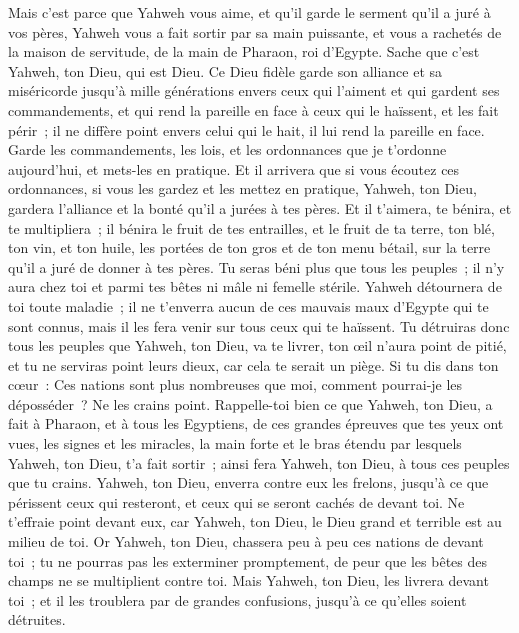 \begin{multicols}{2}
Mais c'est parce que Yahweh vous aime, et qu'il garde le serment qu'il a juré à vos pères, Yahweh vous a fait sortir par sa main puissante, et vous a rachetés de la maison de servitude, de la main de Pharaon, roi d'Egypte.
Sache que c'est Yahweh, ton Dieu, qui est Dieu. Ce Dieu fidèle garde son alliance et sa miséricorde jusqu'à mille générations envers ceux qui l'aiment et qui gardent ses commandements,
et qui rend la pareille en face à ceux qui le haïssent, et les fait périr~; il ne diffère point envers celui qui le hait, il lui rend la pareille en face.
Garde les commandements, les lois, et les ordonnances que je t'ordonne aujourd'hui, et mets-les en pratique.
Et il arrivera que si vous écoutez ces ordonnances, si vous les gardez et les mettez en pratique, Yahweh, ton Dieu, gardera l'alliance et la bonté qu'il a jurées à tes pères.
Et il t'aimera, te bénira, et te multipliera~; il bénira le fruit de tes entrailles, et le fruit de ta terre, ton blé, ton vin, et ton huile, les portées de ton gros et de ton menu bétail, sur la terre qu'il a juré de donner à tes pères.
Tu seras béni plus que tous les peuples~; il n'y aura chez toi et parmi tes bêtes ni mâle ni femelle stérile.
Yahweh détournera de toi toute maladie~; il ne t'enverra aucun de ces mauvais maux d'Egypte qui te sont connus, mais il les fera venir sur tous ceux qui te haïssent.
Tu détruiras donc tous les peuples que Yahweh, ton Dieu, va te livrer, ton œil n'aura point de pitié, et tu ne serviras point leurs dieux, car cela te serait un piège.
Si tu dis dans ton cœur~: Ces nations sont plus nombreuses que moi, comment pourrai-je les déposséder~?
Ne les crains point. Rappelle-toi bien ce que Yahweh, ton Dieu, a fait à Pharaon, et à tous les Egyptiens,
de ces grandes épreuves que tes yeux ont vues, les signes et les miracles, la main forte et le bras étendu par lesquels Yahweh, ton Dieu, t'a fait sortir~; ainsi fera Yahweh, ton Dieu, à tous ces peuples que tu crains.
Yahweh, ton Dieu, enverra contre eux les frelons, jusqu'à ce que périssent ceux qui resteront, et ceux qui se seront cachés de devant toi.
Ne t'effraie point devant eux, car Yahweh, ton Dieu, le Dieu grand et terrible est au milieu de toi.
Or Yahweh, ton Dieu, chassera peu à peu ces nations de devant toi~; tu ne pourras pas les exterminer promptement, de peur que les bêtes des champs ne se multiplient contre toi.
Mais Yahweh, ton Dieu, les livrera devant toi~; et il les troublera par de grandes confusions, jusqu'à ce qu'elles soient détruites.

\end{multicols}

